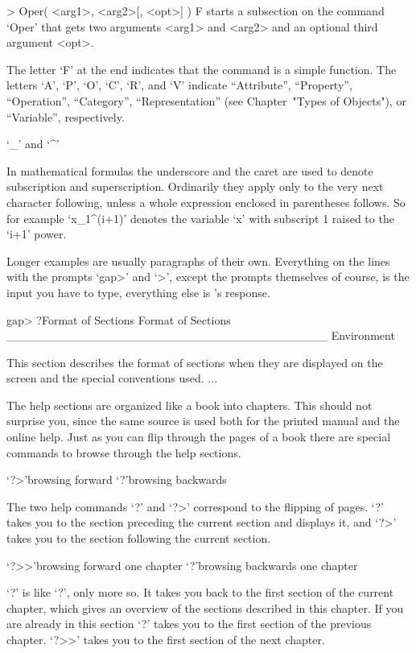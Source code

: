 \begintt
> Oper( <arg1>, <arg2>[, <opt>] ) F
\endtt
starts a subsection on the command `Oper' that gets two arguments <arg1>
and <arg2> and an optional third argument <opt>.

The letter `F' at the end
indicates that the command is a simple function.
The letters `A', `P', `O', `C', `R', and `V' indicate
``Attribute'', ``Property'', ``Operation'', ``Category'', ``Representation''
(see Chapter~"Types of Objects"), or ``Variable'', respectively.

`_' and `^'

In mathematical formulas the underscore and the caret are used to denote
subscription and superscription. Ordinarily they apply only to the very
next character following, unless a whole expression enclosed in
parentheses follows. So for example `x_1^(i+1)' denotes the variable `x'
with subscript 1 raised to the `i+1' power.

Longer examples are usually paragraphs of their own.
Everything on the lines with the prompts `gap>' and `>', except
the prompts themselves of course, is the input you have to type,
everything else is {\GAP}'s response.

\begintt
gap> ?Format of Sections
Format of Sections ______________________________________ Environment

This section describes the format of sections when they are displayed
on the screen and the special conventions used.
... 
\endtt


The help sections are organized like a book into chapters. This should
not surprise you, since the same source is used both for the printed
manual and the online help. Just as you can flip through the pages of a
book there are special commands to browse through the help sections.

\>`?>'{browsing forward}
\>`?\<'{browsing backwards}

The two help commands `?\<' and `?>' correspond to the flipping of pages.
`?\<' takes you to the section preceding the current section and displays
it, and `?>' takes you to the section following the current section.

\>`?>>'{browsing forward one chapter}
\>`?\<\<'{browsing backwards one chapter}

`?\<\<' is like `?\<', only more so. It takes you back to the first
section of the current chapter, which gives an overview of the sections
described in this chapter. If you are already in this section `?\<\<'
takes you to the first section of the previous chapter. `?>>' takes you
to the first section of the next chapter.

